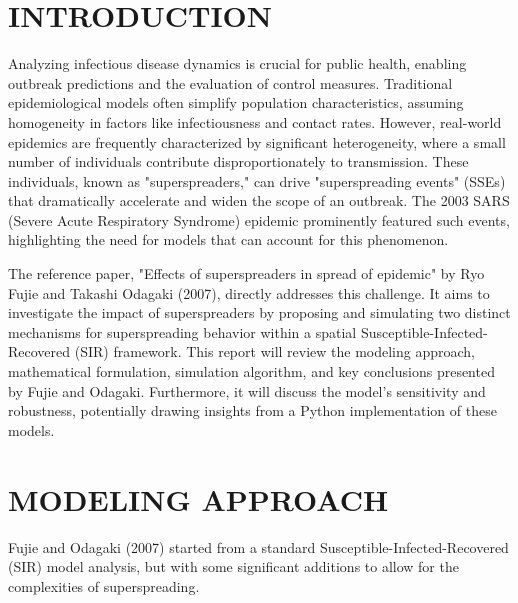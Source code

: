 \documentclass{article}
\begin{document}
\section{INTRODUCTION}
Analyzing infectious disease dynamics is crucial for public health, enabling outbreak predictions and the evaluation of control measures. Traditional epidemiological models often simplify population characteristics, assuming homogeneity in factors like infectiousness and contact rates. However, real-world epidemics are frequently characterized by significant heterogeneity, where a small number of individuals contribute disproportionately to transmission. These individuals, known as "superspreaders," can drive "superspreading events" (SSEs) that dramatically accelerate and widen the scope of an outbreak. The 2003 SARS (Severe Acute Respiratory Syndrome) epidemic prominently featured such events, highlighting the need for models that can account for this phenomenon.

The reference paper, "Effects of superspreaders in spread of epidemic" by Ryo Fujie and Takashi Odagaki (2007), directly addresses this challenge. It aims to investigate the impact of superspreaders by proposing and simulating two distinct mechanisms for superspreading behavior within a spatial Susceptible-Infected-Recovered (SIR) framework. This report will review the modeling approach, mathematical formulation, simulation algorithm, and key conclusions presented by Fujie and Odagaki. Furthermore, it will discuss the model's sensitivity and robustness, potentially drawing insights from a Python implementation of these models.

\section{MODELING APPROACH}
Fujie and Odagaki (2007) started from a standard Susceptible-Infected-Recovered (SIR) model analysis, but with some significant additions to allow for the complexities of superspreading.
\end{document}
